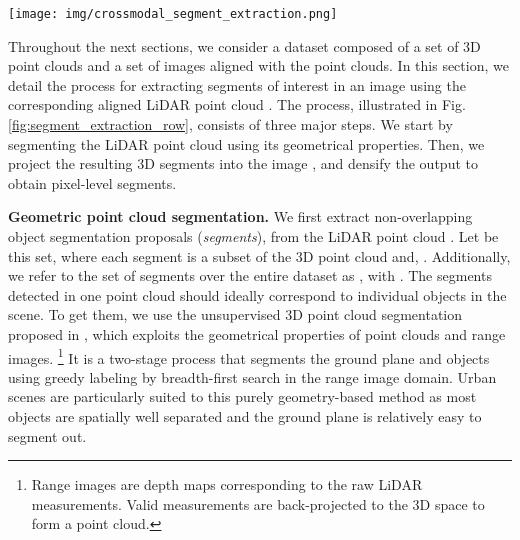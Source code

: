 \documentclass[runningheads]{llncs}
\newcommand{\paragraphcustom}[1]{\smallskip\noindent\textbf{#1}}
\begin{document}
\begin{figure*}[t]
    \centering
    \vspace{-5pt}
    \texttt{[image: img/crossmodal\_segment\_extraction.png]}
    \vspace{-22pt}
    \caption{\textbf{Cross-modal segment extraction}. Input raw point cloud (a) is first segmented with~\cite{bogoslavskyi17pfg}
    into object segment candidates (b), which are then projected into the image (c); Projected segments are densified to get pixel-level pseudo-labels, with missed pixels being labeled as ``ignore'', as shown in black (d).
    }
    \label{fig:segment_extraction_row}
    \vspace*{-6mm}
\end{figure*}

Throughout the next sections, we consider a dataset composed of a set  of 3D point clouds and a set  of images aligned with the point clouds. In this section, we detail the process for extracting segments of interest in an image  using the corresponding aligned LiDAR point cloud . The process, illustrated in Fig.\,\ref{fig:segment_extraction_row}, consists of three major steps. We start by segmenting the LiDAR point cloud 
 using its geometrical properties. Then, we project the resulting 3D segments into the image
, and densify the output to obtain pixel-level segments. 

\paragraphcustom{Geometric point cloud segmentation.} 
We first extract  non-overlapping object segmentation proposals (\emph{segments}), from the LiDAR point cloud
. Let  be this set, where each segment  is a subset of the 3D point cloud  and, . Additionally, we refer to the set of segments over the entire dataset as , with . The  segments detected in one point cloud should ideally correspond to  individual objects in the scene. To get them, we use the unsupervised 3D point cloud segmentation proposed in \cite{bogoslavskyi17pfg}, which exploits the geometrical properties of point clouds and range images.
\footnote{
Range images are depth maps corresponding to the raw LiDAR measurements. Valid measurements are back-projected to the 3D space to form a point cloud.
} 
It is a two-stage process that segments the ground plane and objects using greedy labeling by breadth-first search in the range image domain. Urban scenes are particularly suited to this purely geometry-based method as most objects are spatially well separated and the ground plane is relatively easy to segment out.
\end{document}

